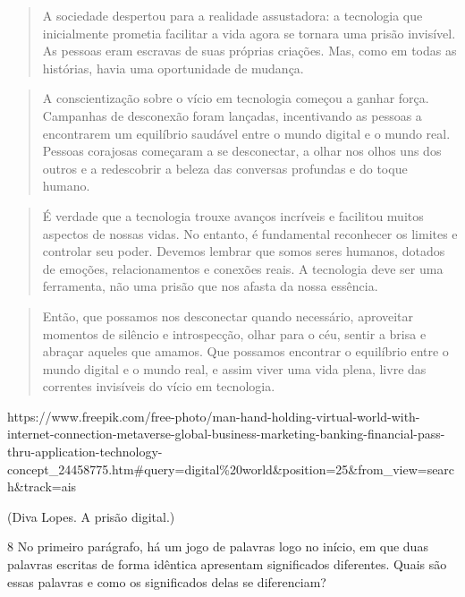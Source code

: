 \begin{quote}
A sociedade despertou para a realidade assustadora: a tecnologia que
inicialmente prometia facilitar a vida agora se tornara uma prisão
invisível. As pessoas eram escravas de suas próprias criações. Mas, como
em todas as histórias, havia uma oportunidade de mudança.
\end{quote}

\begin{quote}
A conscientização sobre o vício em tecnologia começou a ganhar força.
Campanhas de desconexão foram lançadas, incentivando as pessoas a
encontrarem um equilíbrio saudável entre o mundo digital e o mundo real.
Pessoas corajosas começaram a se desconectar, a olhar nos olhos uns dos
outros e a redescobrir a beleza das conversas profundas e do toque
humano.
\end{quote}

\begin{quote}
É verdade que a tecnologia trouxe avanços incríveis e facilitou muitos
aspectos de nossas vidas. No entanto, é fundamental reconhecer os
limites e controlar seu poder. Devemos lembrar que somos seres humanos,
dotados de emoções, relacionamentos e conexões reais. A tecnologia deve
ser uma ferramenta, não uma prisão que nos afasta da nossa essência.
\end{quote}

\begin{quote}
Então, que possamos nos desconectar quando necessário, aproveitar
momentos de silêncio e introspecção, olhar para o céu, sentir a brisa e
abraçar aqueles que amamos. Que possamos encontrar o equilíbrio entre o
mundo digital e o mundo real, e assim viver uma vida plena, livre das
correntes invisíveis do vício em tecnologia.
\end{quote}

https://www.freepik.com/free-photo/man-hand-holding-virtual-world-with-internet-connection-metaverse-global-business-marketing-banking-financial-pass-thru-application-technology-concept\_24458775.htm\#query=digital\%20world\&position=25\&from\_view=search\&track=ais

(Diva Lopes. A prisão digital.)

\num{8} No primeiro parágrafo, há um jogo de palavras logo no início, em
que duas palavras escritas de forma idêntica apresentam significados
diferentes. Quais são essas palavras e como os significados delas se
diferenciam?


